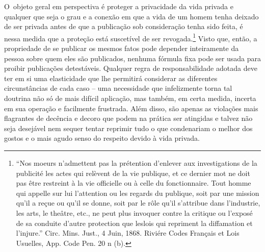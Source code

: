 O~objeto geral em perspectiva é proteger a privacidade da vida privada e
qualquer que seja o grau e a conexão em que a vida de um homem tenha
deixado de ser privada antes de que a publicação sob consideração tenha
sido feita, é nessa medida que a proteção está suscetível de ser
revogada.\footnote{``Nos moeurs n'admettent pas la prétention d'enlever
  aux investigations de la publicité les actes qui relèvent de la vie
  publique, et ce dernier mot ne doit pas être restreint à la vie
  officielle ou à celle du fonctionnaire. Tout homme qui appelle sur lui
  l'attention ou les regards du publique, soit par une mission qu'il a
  reçue ou qu'il se donne, soit par le rôle qu'il s'attribue dans
  l'industrie, les arts, le theâtre, etc., ne peut plus invoquer contre
  la critique ou l'exposé de sa conduite d'autre protection que leslois
  qui repriment la diffamation et l'injure.'' Circ. Mins. Just., 4 Juin,
  1868. Riviére Codes Français et Lois Usuelles, App. Code Pen. 20 n
  (b).} Visto que, então, a propriedade de se publicar os mesmos fatos
pode depender inteiramente da pessoa sobre quem eles são publicados,
nenhuma fórmula fixa pode ser usada para proibir publicações
detestáveis. Qualquer regra de responsabilidade adotada deve ter em si
uma elasticidade que lhe permitirá considerar as diferentes
circunstâncias de cada caso -- uma necessidade que infelizmente torna
tal doutrina não só de mais difícil aplicação, mas também, em certa
medida, incerta em sua operação e facilmente frustrada. Além disso, são
apenas as violações mais flagrantes de decência e decoro que podem na
prática ser atingidas e talvez não seja desejável nem sequer tentar
reprimir tudo o que condenariam o melhor dos gostos e o mais agudo senso
do respeito devido à vida privada.

